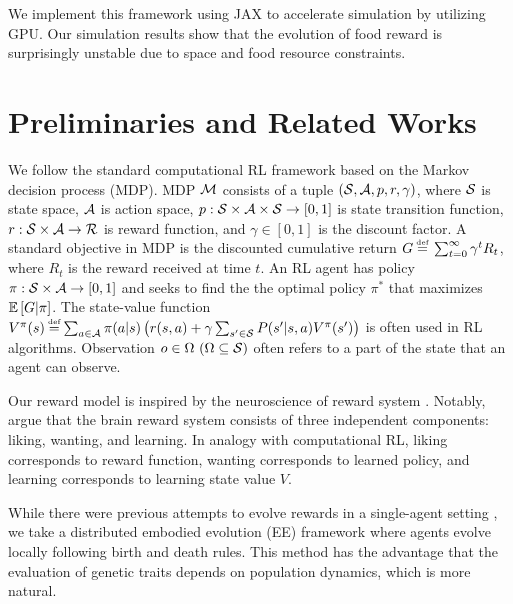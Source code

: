 We implement this framework using JAX\citep{jax2018github} to accelerate simulation by utilizing GPU. Our simulation results show that the evolution of food reward is surprisingly unstable due to space and food resource constraints.

\section{Preliminaries and Related Works}\label{sec:related}
We follow the standard computational RL framework \citep{suttonReinforcementLearningIntroduction2018} based on the Markov decision process (MDP). MDP $\mathcal{M}{}$ consists of a tuple $(\mathcal{S}{}, \mathcal{A}{}, p, r, \gamma)$, where $\mathcal{S}{}$ is state space, $\mathcal{A}{}$ is action space, $p: \mathcal{S}\times\mathcal{A}\times \mathcal{S} \rightarrow [0, 1]$ is state transition function, $r: \mathcal{S}\times\mathcal{A} \rightarrow \mathcal{R}$ is reward function, and $\gamma \in [0, 1]$ is the discount factor. A standard objective in MDP is the discounted cumulative return $G \defequal{} \sum_{t=0}^{\infty}\gamma^t R_{t}$, where $R_t$ is the reward received at time $t$. An RL agent has policy $\pi: \mathcal{S} \times \mathcal{A} \rightarrow [0, 1]$ and seeks to find the the optimal policy $\pi^{*}$ that maximizes $\mathbb{E} \left[G|\pi\right]$. The state-value function $V^\pi(s) \defequal \sum_{a \in \A} \pi(a|s) \left( r(s, a) + \gamma \sum_{s' \in \X} P(s'|s, a) V^\pi(s') \right)$ is often used in RL algorithms. Observation $o \in \Omega~(\Omega \subseteq \mathcal{S})$ often refers to a part of the state that an agent can observe.

Our reward model is inspired by the neuroscience of reward system \citep{schultzNeuronalRewardDecision2015, berridgePleasureSystemsBrain2015}. Notably, \citet{berridgeDissectingComponentsReward2009} argue that the brain reward system consists of three independent components: liking, wanting, and learning. In analogy with computational RL, liking corresponds to reward function, wanting corresponds to learned policy, and learning corresponds to learning state value $V$. %

While 
there were previous attempts to evolve rewards in a single-agent setting \citep{singhWhereRewardsCome2009,niekumEvolutionRewardFunctions2011,zhengWhatCanLearned2020},
we take a distributed embodied evolution (EE) framework \citep{watsonEmbodiedEvolutionDistributing2002,bredecheEmbodiedEvolutionCollective2018}
where agents evolve locally following birth and death rules. This method has the advantage that the evaluation of genetic traits depends on population dynamics, which is more natural.

